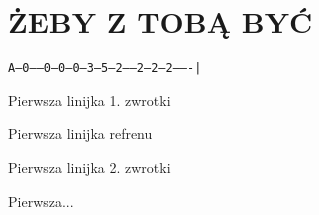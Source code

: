 \documentclass[../../../songbook.tex]{subfiles}
\begin{document}
\TabPositions{8cm} %
\section*{ŻEBY Z TOBĄ BYĆ}
{}
\vspace{0.5cm}

 \texttt{A--0------0--0--0--3--5--2-----2--2--2-------|	}	\newline

Pierwsza linijka 1. zwrotki				     \newline	  

\-\hspace{1cm} Pierwsza linijka refrenu		\newline
      
Pierwsza linijka 2. zwrotki				     \newline

\-\hspace{1cm} Pierwsza...
\end{document}
